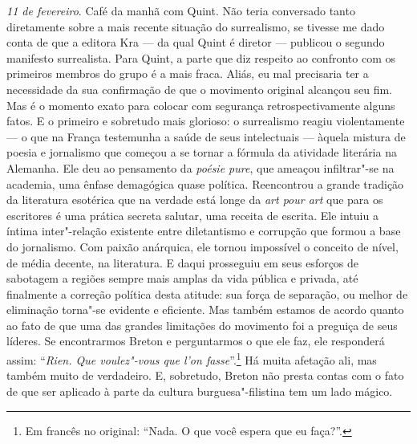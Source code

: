 \emph{11 de fevereiro}. Café da manhã com Quint. Não teria conversado
tanto diretamente sobre a mais recente situação do surrealismo, se
tivesse me dado conta de que a editora Kra --- da qual Quint é diretor ---
publicou o segundo manifesto surrealista. Para Quint, a parte que diz
respeito ao confronto com os primeiros membros do grupo é a mais fraca.
Aliás, eu mal precisaria ter a necessidade da sua confirmação de que o
movimento original alcançou seu fim. Mas é o momento exato para colocar
com segurança retrospectivamente alguns fatos. E o primeiro e sobretudo
mais glorioso: o surrealismo reagiu violentamente --- o que na França
testemunha a saúde de seus intelectuais --- àquela mistura de poesia e
jornalismo que começou a se tornar a fórmula da atividade literária na
Alemanha. Ele deu ao pensamento da \emph{poésie pure}, que ameaçou
infiltrar"-se na academia, uma ênfase demagógica quase política.
Reencontrou a grande tradição da literatura esotérica que na verdade
está longe da \emph{art pour art} que para os escritores é uma prática
secreta salutar, uma receita de escrita. Ele intuiu a íntima
inter"-relação existente entre diletantismo e corrupção que formou a base
do jornalismo. Com paixão anárquica, ele tornou impossível o conceito de
nível, de média decente, na literatura. E daqui prosseguiu em seus
esforços de sabotagem a regiões sempre mais amplas da vida pública e
privada, até finalmente a correção política desta atitude: sua força de
separação, ou melhor de eliminação torna"-se evidente e eficiente. Mas
também estamos de acordo quanto ao fato de que uma das grandes
limitações do movimento foi a preguiça de seus líderes. Se encontrarmos
Breton e perguntarmos o que ele faz, ele responderá assim: ``\emph{Rien.
Que voulez"-vous que l'on fasse}''.\footnote{Em francês no original: ``Nada. O que você espera
  que eu faça?''. \versal{[N. T.]}} Há muita afetação ali, mas
também muito de verdadeiro. E, sobretudo, Breton não presta contas com o
fato de que ser aplicado à parte da cultura burguesa"-filistina tem um
lado mágico.

